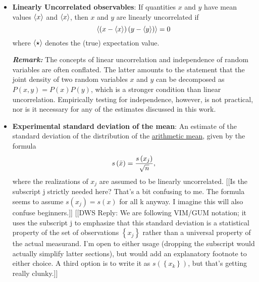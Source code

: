 \begin{itemize}
  \item {\bf Linearly Uncorrelated observables}:  If quantities $x$ and $y$ have mean values $\langle x \rangle$ and $\langle x \rangle$, then $x$ and $y$ are linearly uncorrelated if
\begin{equation}
  \langle  \left(x - \langle x \rangle \right) \left(y - \langle y \rangle \right)  \rangle = 0 \label{def:unc_obs}
\end{equation}
where $\langle \star \rangle$ denotes the (true) expectation value.

\smallskip

\textbf{\textit{Remark:}} The concepts of linear uncorrelation and independence of random variables are often conflated.  The latter amounts to the statement that the joint density of two random variables $x$ and $y$ can be decomposed as $P(x,y)=P(x)P(y)$, which is a stronger condition than linear uncorrelation.  Empirically testing for independence, however, is not practical, nor is it necessary for any of the estimates discussed in this work.
  
\item {\bf Experimental standard deviation of the mean}: An estimate of the standard deviation of the distribution of the \hyperref[def:arith_mean]{arithmetic mean}, given by the formula
  \begin{equation}
    s\left( \bar{x} \right) = \dfrac{s\left( x_j \right)}{\sqrt{n}}, \label{def:exp_st_dev_mean}
  \end{equation}
  where the realizations of $x_j$ are assumed to be linearly uncorrelated.
{\color{red}[[Is the subscript j strictly needed here?  That's a bit confusing to me.  The formula seems to assume $s(x_j) = s(x)$ for all k anyway.  I imagine this will also confuse beginners.]]}
{\color{blue}[[DWS Reply: We are following VIM/GUM notation; it uses the subscript j to emphasize that this standard deviation is a statistical property of the set of observations $\left\{x_j\right\}$ rather than a universal property of the actual measurand. I'm open to either usage (dropping the subscript would actually simplify latter sections), but would add an explanatory footnote to either choice. A third option is to write it as $s\left(\left\{x_k\right\}\right)$, but that's getting really clunky.]]}


\end{itemize}
